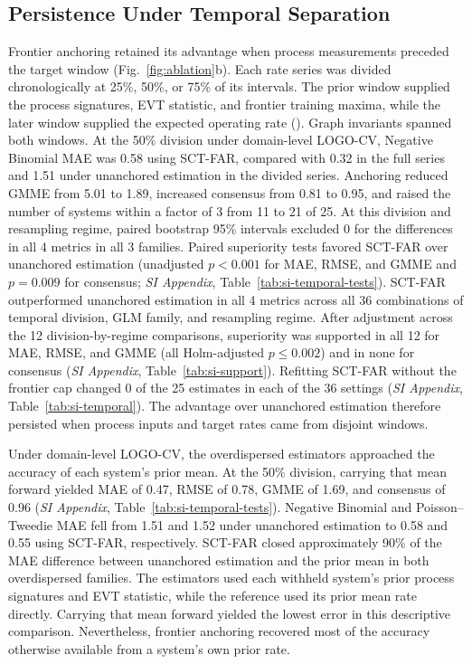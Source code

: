 \documentclass{article}
\begin{document}
\subsection*{Persistence Under Temporal Separation}
\label{sub-sec:temporal}
Frontier anchoring retained its advantage when process measurements preceded the target window (Fig.~\ref{fig:ablation}b). Each rate series was divided chronologically at 25\%, 50\%, or 75\% of its intervals. The prior window supplied the process signatures, EVT statistic, and frontier training maxima, while the later window supplied the expected operating rate (). Graph invariants spanned both windows. At the 50\% division under domain-level LOGO-CV, Negative Binomial MAE was 0.58 using SCT-FAR, compared with 0.32 in the full series and 1.51 under unanchored estimation in the divided series. Anchoring reduced GMME from 5.01 to 1.89, increased consensus from 0.81 to 0.95, and raised the number of systems within a factor of 3 from 11 to 21 of 25. At this division and resampling regime, paired bootstrap 95\% intervals excluded 0 for the differences in all 4 metrics in all 3 families. Paired superiority tests favored SCT-FAR over unanchored estimation (unadjusted $p < 0.001$ for MAE, RMSE, and GMME and $p = 0.009$ for consensus; \textit{SI Appendix}, Table~\ref{tab:si-temporal-tests}). SCT-FAR outperformed unanchored estimation in all 4 metrics across all 36 combinations of temporal division, GLM family, and resampling regime. After adjustment across the 12 division-by-regime comparisons, superiority was supported in all 12 for MAE, RMSE, and GMME (all Holm-adjusted $p \leq 0.002$) and in none for consensus (\textit{SI Appendix}, Table~\ref{tab:si-support}). Refitting SCT-FAR without the frontier cap changed 0 of the 25 estimates in each of the 36 settings (\textit{SI Appendix}, Table~\ref{tab:si-temporal}). The advantage over unanchored estimation therefore persisted when process inputs and target rates came from disjoint windows.

Under domain-level LOGO-CV, the overdispersed estimators approached the accuracy of each system's prior mean. At the 50\% division, carrying that mean forward yielded MAE of 0.47, RMSE of 0.78, GMME of 1.69, and consensus of 0.96 (\textit{SI Appendix}, Table~\ref{tab:si-temporal-tests}). Negative Binomial and Poisson--Tweedie MAE fell from 1.51 and 1.52 under unanchored estimation to 0.58 and 0.55 using SCT-FAR, respectively. SCT-FAR closed approximately 90\% of the MAE difference between unanchored estimation and the prior mean in both overdispersed families. The estimators used each withheld system's prior process signatures and EVT statistic, while the reference used its prior mean rate directly. Carrying that mean forward yielded the lowest error in this descriptive comparison. Nevertheless, frontier anchoring recovered most of the accuracy otherwise available from a system's own prior rate.
\end{document}

